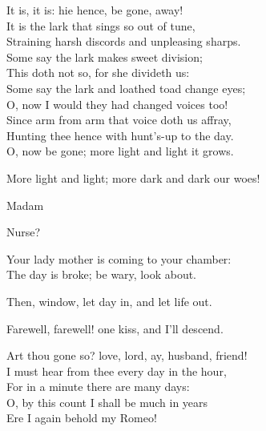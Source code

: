 \begin{speech}
It is, it is: hie hence, be gone, away! \\
It is the lark that sings so out of tune, \\
Straining harsh discords and unpleasing sharps. \\
Some say the lark makes sweet division; \\
This doth not so, for she divideth us: \\
Some say the lark and loathed toad change eyes; \\
O, now I would they had changed voices too! \\
Since arm from arm that voice doth us affray, \\
Hunting thee hence with hunt's-up to the day. \\
O, now be gone; more light and light it grows. \\
\end{speech}
\begin{speech}
More light and light; more dark and dark our woes!
 \\
\end{speech}
\begin{speech}
Madam \\
\end{speech}
\begin{speech}
Nurse? \\
\end{speech}
\begin{speech}
Your lady mother is coming to your chamber: \\
The day is broke; be wary, look about.  \\
\end{speech}
\begin{speech}
Then, window, let day in, and let life out. \\
\end{speech}
\begin{speech}
Farewell, farewell! one kiss, and I'll descend.  \\
\end{speech}
\begin{speech}
Art thou gone so? love, lord, ay, husband, friend!
\\
I must hear from thee every day in the hour, \\
For in a minute there are many days: \\
O, by this count I shall be much in years \\
Ere I again behold my Romeo! \\
\end{speech}
